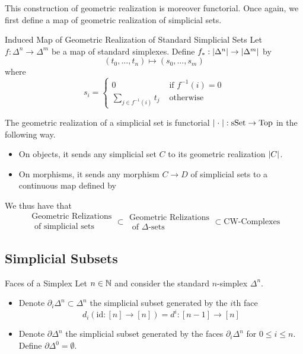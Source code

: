 \documentclass[a4paper]{article}
\begin{document}
This construction of geometric realization is moreover functorial. Once again, we first define a map of geometric realization of simplicial sets. 

\begin{defn}{Induced Map of Geometric Realization of Standard Simplicial Sets}{} Let $f:\Delta^n\to\Delta^m$ be a map of standard simplexes. Define $f_\ast:\abs{\Delta^n}\to\abs{\Delta^m}$ by $$(t_0,\dots,t_n)\mapsto(s_0,\dots,s_m)$$ where $$s_i=\begin{cases}
0 & \text{ if } f^{-1}(i)=0\\
\sum_{j\in f^{-1}(i)}t_j & \text{ otherwise }
\end{cases}$$
\end{defn}

\begin{thm}{}{} The geometric realization of a simplicial set is functorial $\abs{\;\cdot\;}:\text{sSet}\to\text{Top}$ in the following way. 
\begin{itemize}
\item On objects, it sends any simplicial set $C$ to its geometric realization $\abs{C}$. 
\item On morphisms, it sends any morphism $C\to D$ of simplicial sets to a continuous map defined by 
\end{itemize}
\end{thm}

We thus have that $$\substack{\text{Geometric Relizations}\\\text{ of simplicial sets}}\subset\substack{\text{Geometric Relizations}\\\text{ of }\Delta\text{-sets}}\subset\text{CW-Complexes}$$

\subsection{Simplicial Subsets}
\begin{defn}{Faces of a Simplex}{} Let $n\in\mathbb{N}$ and consider the standard $n$-simplex $\Delta^n$. 
\begin{itemize}
\item Denote $\partial_i\Delta^n\subset\Delta^n$ the simplicial subset generated by the $i$th face $$d_i(\text{id}:[n]\to[n])=d^i:[n-1]\to[n]$$
\item Denote $\partial\Delta^n$ the simplicial subset generated by the faces $\partial_i\Delta^n$ for $0\leq i\leq n$. Define $\partial\Delta^0=\emptyset$. 
\end{itemize}
\end{defn}
\end{document}
